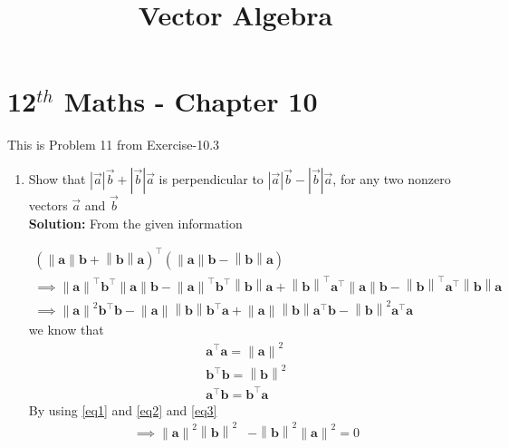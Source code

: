 \documentclass[10pt]{article}
\providecommand{\brak}[1]{\ensuremath{\left(#1\right)}}
\newcommand{\solution}{\noindent \textbf{Solution: }}
\providecommand{\norm}[1]{\left\lVert#1\right\rVert}
\providecommand{\abs}[1]{\left\vert#1\right\vert}
\let\vec\mathbf{}
\begin{document}
\begin{center}
\title{\textbf{Vector Algebra}}
\date{\vspace{-5ex}} %
\maketitle
\end{center}

\section{12$^{th}$ Maths - Chapter 10}
This is Problem 11 from Exercise-10.3
\begin{enumerate}
\item Show that $\abs{\overrightarrow{a}}\overrightarrow{b}+\abs{\overrightarrow{b}}\overrightarrow{a}$ is perpendicular to $\abs{\overrightarrow{a}}\overrightarrow{b}-\abs{\overrightarrow{b}}\overrightarrow{a}$, for any two nonzero vectors $\overrightarrow{a}$ and $\overrightarrow{b}$\\  

\solution
From the given information

\begin{align}
\brak{\norm{\vec{a}}\vec{b}+\norm{\vec{b}}\vec{a}}^\top\brak{\norm{\vec{a}}\vec{b}-\norm{\vec{b}}\vec{a}}\\
\implies \norm{\vec{a}}^\top\vec{b}^\top\norm{\vec{a}}\vec{b}-\norm{\vec{a}}^\top\vec{b}^\top\norm{\vec{b}}\vec{a}+\norm{\vec{b}}^\top\vec{a}^\top\norm{\vec{a}}\vec{b}-\norm{\vec{b}}^\top\vec{a}^\top\norm{\vec{b}}\vec{a}\\
\implies \norm{\vec{a}}^2\vec{b}^\top\vec{b}-\norm{\vec{a}}\norm{\vec{b}}\vec{b}^\top\vec{a}+\norm{\vec{a}}\norm{\vec{b}}\vec{a}^\top\vec{b}-\norm{\vec{b}}^2\vec{a}^\top\vec{a}
\end{align}
we know that
\begin{align}
    \vec{a}^{\top}\vec{a} = \norm{\vec{a}}^2
    \label{eq1}  \\
    \vec{b}^{\top}\vec{b} = \norm{\vec{b}}^2
    \label{eq2}  \\
    \vec{a}^{\top}\vec{b} = \vec{b}^{\top}\vec{a}
    \label{eq3}
\end{align}
By using \eqref{eq1} and \eqref{eq2} and \eqref{eq3}
\begin{align}
	\implies\norm{\vec{a}}^2\norm{\vec{b}}^2&-\norm{\vec{b}}^2\norm{\vec{a}}^2=0
\end{align}
\end{enumerate}
\end{document}
